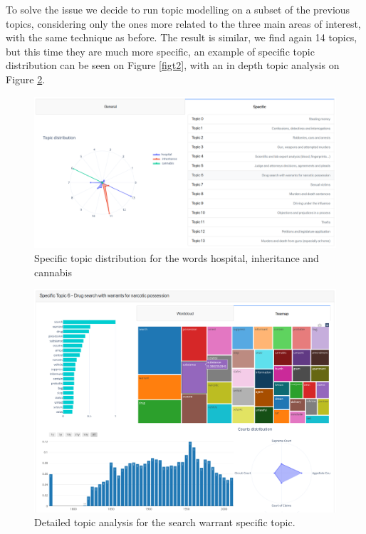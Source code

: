 To solve the issue we decide to run topic modelling on a subset of the previous 
topics, considering only the ones more related to the three main areas of interest, with the same technique as before.
The result is similar, we find again 14 topics,
but this time they are much more specific, an example of specific topic distribution can 
be seen on Figure \vref{figt2}, with an in depth topic analysis on Figure \ref{figt3}.
\begin{figure}
  \begin{center}
    \includegraphics[width=\textwidth]{images/topic2.png}
    \caption{Specific topic distribution for the words hospital, inheritance and cannabis} \label{figt2}
  \end{center}
\end{figure}
\begin{figure}
  \begin{center}
    \includegraphics[width=\textwidth]{images/topic3.png}
    \caption{Detailed topic analysis for the search warrant specific topic.} \label{figt3}
  \end{center}
\end{figure}

